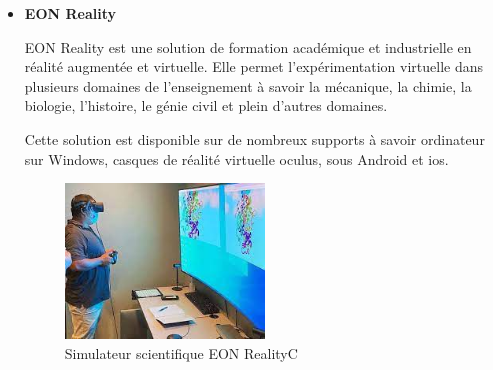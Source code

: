\begin{itemize}
	\item \textbf{EON Reality}

	EON Reality est une solution de formation académique et industrielle en réalité augmentée et virtuelle. Elle permet l'expérimentation virtuelle dans plusieurs domaines de l’enseignement à savoir la mécanique, la chimie, la biologie, l’histoire, le génie civil et plein d’autres domaines.

	Cette solution est disponible sur de nombreux supports à savoir ordinateur sur Windows, casques de réalité virtuelle oculus, sous Android et ios.

	      \begin{figure}[H]
		      \centering
		      \includegraphics[width=0.5\textwidth]{img/vlab2}
		      \caption{Simulateur scientifique EON RealityC}
		      \label{fig:mesh1}
	      \end{figure}
\end{itemize}

